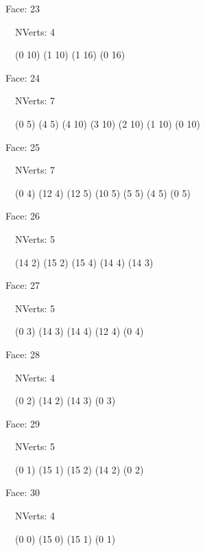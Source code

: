 \documentclass{article}
\begin{document}
{\footnotesize 

Face: 23

\   \    NVerts: 4

 \   \   (0 10) (1 10) (1 16) (0 16)}

{\footnotesize 

Face: 24

\   \    NVerts: 7

 \   \   (0 5) (4 5) (4 10) (3 10) (2 10) (1 10) (0 10)}

{\footnotesize 

Face: 25

\   \    NVerts: 7

 \   \   (0 4) (12 4) (12 5) (10 5) (5 5) (4 5) (0 5)}

{\footnotesize 

Face: 26

\   \    NVerts: 5

 \   \   (14 2) (15 2) (15 4) (14 4) (14 3)}

{\footnotesize 

Face: 27

\   \    NVerts: 5

 \   \   (0 3) (14 3) (14 4) (12 4) (0 4)}

{\footnotesize 

Face: 28

\   \    NVerts: 4

 \   \   (0 2) (14 2) (14 3) (0 3)}

{\footnotesize 

Face: 29

\   \    NVerts: 5

 \   \   (0 1) (15 1) (15 2) (14 2) (0 2)}

{\footnotesize 

Face: 30

\   \    NVerts: 4

 \   \   (0 0) (15 0) (15 1) (0 1)}


 \newpage
\end{document}
